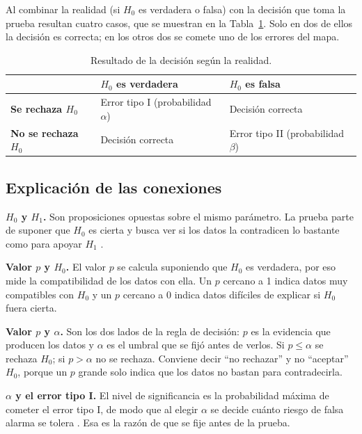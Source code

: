\documentclass[11pt,letterpaper]{article}
\begin{document}
Al combinar la realidad (si $H_0$ es verdadera o falsa) con la decisión que toma la prueba resultan cuatro casos, que se muestran en la Tabla~\ref{tab:decisiones}. Solo en dos de ellos la decisión es correcta; en los otros dos se comete uno de los errores del mapa.

\begin{table}[htbp]
\centering
\caption{Resultado de la decisión según la realidad.}
\label{tab:decisiones}
\small
\renewcommand{\arraystretch}{1.5}
\begin{tabular}{p{3.2cm}p{5.8cm}p{5.8cm}}
\hline
 & \textbf{$H_0$ es verdadera} & \textbf{$H_0$ es falsa} \\
\hline
\textbf{Se rechaza $H_0$} & Error tipo I (probabilidad $\alpha$) & Decisión correcta \\
\textbf{No se rechaza $H_0$} & Decisión correcta & Error tipo II (probabilidad $\beta$) \\
\hline
\end{tabular}
\end{table}

\subsection{Explicación de las conexiones}

\textbf{$H_0$ y $H_1$.} Son proposiciones opuestas sobre el mismo parámetro. La prueba parte de suponer que $H_0$ es cierta y busca ver si los datos la contradicen lo bastante como para apoyar $H_1$ \parencite{tecnm2026_documento_fuente}.

\textbf{Valor $p$ y $H_0$.} El valor $p$ se calcula suponiendo que $H_0$ es verdadera, por eso mide la compatibilidad de los datos con ella. Un $p$ cercano a 1 indica datos muy compatibles con $H_0$ y un $p$ cercano a 0 indica datos difíciles de explicar si $H_0$ fuera cierta.

\textbf{Valor $p$ y $\alpha$.} Son los dos lados de la regla de decisión: $p$ es la evidencia que producen los datos y $\alpha$ es el umbral que se fijó antes de verlos. Si $p \le \alpha$ se rechaza $H_0$; si $p > \alpha$ no se rechaza. Conviene decir ``no rechazar'' y no ``aceptar'' $H_0$, porque un $p$ grande solo indica que los datos no bastan para contradecirla.

\textbf{$\alpha$ y el error tipo I.} El nivel de significancia es la probabilidad máxima de cometer el error tipo I, de modo que al elegir $\alpha$ se decide cuánto riesgo de falsa alarma se tolera \parencite{tecnm2026_documento_fuente}. Esa es la razón de que se fije antes de la prueba.
\end{document}
